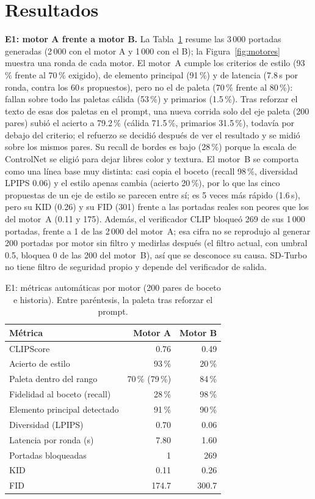 \documentclass[10pt,a4paper,twocolumn]{article}
\begin{document}
\section{Resultados}\label{sec:res}
\textbf{E1: motor A frente a motor B.} La Tabla~\ref{tab:e1} resume las 3\,000 portadas generadas (2\,000 con el motor A y 1\,000 con el B); la Figura~\ref{fig:motores} muestra una ronda de cada motor. El motor~A cumple los criterios de estilo (93\,\% frente al 70\,\% exigido), de elemento principal (91\,\%) y de latencia (7.8\,s por ronda, contra los 60\,s propuestos), pero no el de paleta (70\,\% frente al 80\,\%): fallan sobre todo las paletas cálida (53\,\%) y primarios (1.5\,\%). Tras reforzar el texto de esas dos paletas en el prompt, una nueva corrida solo del eje paleta (200 pares) subió el acierto a 79.2\,\% (cálida 71.5\,\%, primarios 31.5\,\%), todavía por debajo del criterio; el refuerzo se decidió después de ver el resultado y se midió sobre los mismos pares. Su recall de bordes es bajo (28\,\%) porque la escala de ControlNet se eligió para dejar libres color y textura. El motor~B se comporta como una línea base muy distinta: casi copia el boceto (recall 98\,\%, diversidad LPIPS 0.06) y el estilo apenas cambia (acierto 20\,\%), por lo que las cinco propuestas de un eje de estilo se parecen entre sí; es 5 veces más rápido (1.6\,s), pero su KID (0.26) y su FID (301) frente a las portadas reales son peores que los del motor~A (0.11 y 175). Además, el verificador CLIP bloqueó 269 de sus 1\,000 portadas, frente a 1 de las 2\,000 del motor~A; esa cifra no se reprodujo al generar 200 portadas por motor sin filtro y medirlas después (el filtro actual, con umbral 0.5, bloquea 0 de las 200 del motor~B), así que se desconoce su causa. SD-Turbo no tiene filtro de seguridad propio y depende del verificador de salida.

\begin{table}[t]
\centering\scriptsize
\caption{E1: métricas automáticas por motor (200 pares de boceto e historia). Entre paréntesis, la paleta tras reforzar el prompt.}\label{tab:e1}
\begin{tabular}{@{}lrr@{}}
\toprule
\textbf{Métrica} & \textbf{Motor A} & \textbf{Motor B}\\
\midrule
CLIPScore & 0.76 & 0.49\\
Acierto de estilo & 93\,\% & 20\,\%\\
Paleta dentro del rango & 70\,\% (79\,\%) & 84\,\%\\
Fidelidad al boceto (recall) & 28\,\% & 98\,\%\\
Elemento principal detectado & 91\,\% & 90\,\%\\
Diversidad (LPIPS) & 0.70 & 0.06\\
Latencia por ronda (s) & 7.80 & 1.60\\
Portadas bloqueadas & 1 & 269\\
KID & 0.11 & 0.26\\
FID & 174.7 & 300.7\\
\bottomrule
\end{tabular}
\end{table}
\end{document}
